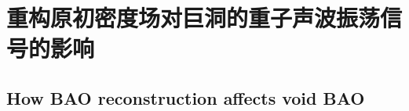\chapter{重构原初密度场对巨洞的重子声波振荡信号的影响}
\label{cha:recon}

\section{How BAO reconstruction affects void BAO } %


